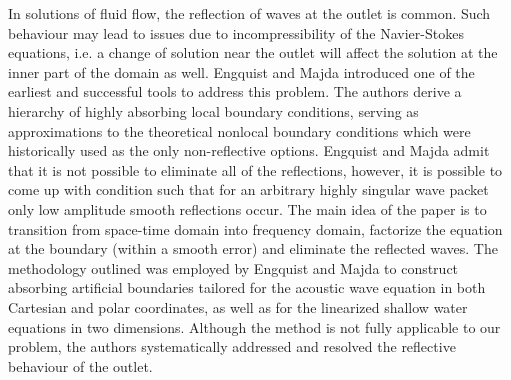 \documentclass{article}
\numberwithin{equation}{section}
\begin{document}
In solutions of fluid flow, the reflection of waves at the outlet is common. Such behaviour may lead to issues due to incompressibility of the Navier-Stokes equations, i.e. a change of solution near the outlet will affect the solution at the inner part of the domain as well. 
Engquist and Majda\cite{Engquist:1977} introduced one of the earliest and successful tools to address this problem. 
The authors derive a hierarchy of highly absorbing local boundary conditions, serving as approximations to the theoretical nonlocal boundary conditions which were historically used as the only non-reflective options. 
Engquist and Majda admit that it is not possible to eliminate all of the reflections, however, it is possible to come up with condition such that for an arbitrary highly singular wave packet only low amplitude smooth reflections occur. %
The main idea of the paper is to transition from space-time domain into frequency domain, factorize the equation at the boundary (within a smooth error) and eliminate the reflected waves.
The methodology outlined was employed by Engquist and Majda to construct absorbing artificial boundaries tailored for the acoustic wave equation in both Cartesian and polar coordinates, as well as for the linearized shallow water equations in two dimensions. 
Although the method is not fully applicable to our problem, the authors systematically addressed and resolved the reflective behaviour of the outlet.
\end{document}
